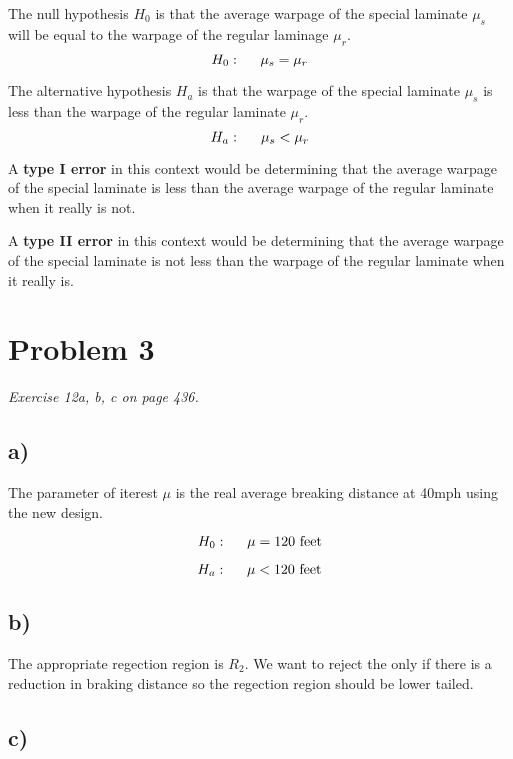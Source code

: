 \documentclass[a4paper,11pt]{article}
\begin{document}
The null hypothesis $H_0$ is that the average warpage of the special laminate $\mu_s$ will be equal to
the warpage of the regular laminage $\mu_r$.\\
\[ H_0: \hspace{5mm} \mu_s = \mu_r \]

\vspace{8mm}
The alternative hypothesis $H_a$ is that the warpage of the special laminate $\mu_s$ is less than the 
warpage of the regular laminate $\mu_r$.
\[ H_a: \hspace{5mm} \mu_s < \mu_r \]

\vspace{8mm}
A \textbf{type I error} in this context would be determining that the average warpage of the special
laminate is less than the average warpage of the regular laminate when it really is not.\newline

A \textbf {type II error} in this context would be determining that the average warpage of the special
laminate is not less than the warpage of the regular laminate when it really is.

\clearpage

\section*{Problem 3}
\textit{Exercise 12a, b, c on page 436.} 

\subsection*{a)}
The parameter of iterest $\mu$ is the real average breaking distance at 40mph using the new design.\newline

\[ H_0 : \hspace{5mm} \mu = 120 \text{ feet} \]

\[ H_a: \hspace{5mm} \mu < 120 \text{ feet} \]


\subsection*{b)}

The appropriate regection region is \textbf{$R_2$}. 
We want to reject the only if there is a reduction in braking distance so the regection region should 
be lower tailed.

\subsection*{c)}
\end{document}
